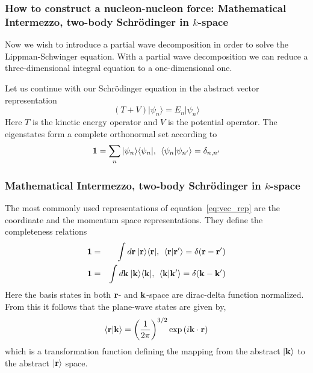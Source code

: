 \documentclass[compress]{beamer}
\begin{document}
\frame
{
\frametitle{How to construct a nucleon-nucleon force: Mathematical Intermezzo, two-body Schr\"odinger in $k$-space}
\begin{small}
{\scriptsize
Now we wish to introduce a partial wave decomposition in order to solve the Lippman-Schwinger equation. With a partial wave decomposition we can reduce a three-dimensional integral equation to a one-dimensional one. 

Let us continue with our Schr\"odinger equation in the abstract vector representation
\begin{equation}
  \left( T + V \right) \vert \psi_n \rangle = E_n \vert\psi_n \rangle 
  \label{eq:vec_rep}
\end{equation}
Here $T$ is the kinetic energy operator and $V$ is the potential operator. 
The eigenstates form a complete orthonormal set according to 
\[ 
{\bf 1} = \sum_n \vert \psi_n\rangle\langle \psi_n \vert, \:\: \langle \psi_n\vert \psi_{n'} \rangle = \delta_{n,n'}
\]
}
\end{small}
}




\frame
{
\frametitle{Mathematical Intermezzo, two-body Schr\"odinger in $k$-space}
\begin{small}
{\scriptsize
The most commonly used representations of equation~\ref{eq:vec_rep} are the coordinate
and
the momentum space representations. They define the completeness relations 
\begin{eqnarray}
 {\bf 1}&  = &  \int d{\bf r} \:\vert  {\bf r} \rangle \langle {\bf r}\vert, \:\: 
 \langle  {\bf r}\vert  {\bf r'} \rangle = \delta ( {\bf r}-{\bf r'}) \\
{\bf 1} & = & \int d{\bf k} \:\vert  {\bf k} \rangle \langle {\bf k}\vert, \:\: 
  \langle  {\bf k}\vert  {\bf k'} \rangle = \delta ( {\bf k}-{\bf k'}) 
\end{eqnarray}
Here the basis states in  both ${\bf r}$- and ${\bf k}$-space are dirac-delta 
function normalized. From this it follows that the plane-wave states are given by,
\begin{equation}
  \langle  {\bf r}\vert  {\bf k} \rangle = \left( 1\over2\pi \right)^{3/2}\exp \left( i {\bf k\cdot r} \right)
  \label{eq:planewave1}
\end{equation}
which is a transformation function defining the mapping from the abstract 
$ \vert {\bf k} \rangle $ to the abstract $\vert {\bf r}\rangle $ space.
}
\end{small}
}
\end{document}
